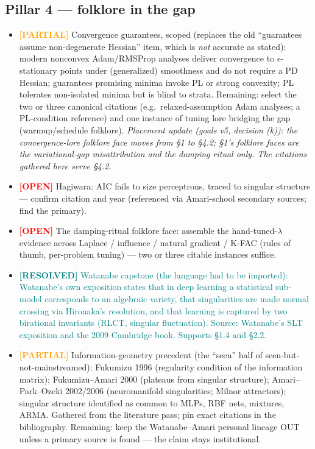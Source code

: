 \documentclass[11pt]{article}
\newcommand{\resolved}[1]{\textcolor{teal}{\textbf{[RESOLVED]} #1}}
\newcommand{\open}{\textcolor{red}{\textbf{[OPEN]}} }
\newcommand{\partialr}{\textcolor{orange}{\textbf{[PARTIAL]}} }
\begin{document}
\subsection*{Pillar 4 --- folklore in the gap}
\begin{itemize}[itemsep=4pt]
\item \partialr Convergence guarantees, scoped (replaces the old
``guarantees assume non-degenerate Hessian'' item, which is \emph{not}
accurate as stated): modern nonconvex Adam/RMSProp analyses deliver
convergence to $\epsilon$-stationary points under (generalized)
smoothness and do not require a PD Hessian; guarantees promising minima
invoke PL or strong convexity; PL tolerates non-isolated minima but is
blind to strata. Remaining: select the two or three canonical citations
(e.g.\ relaxed-assumption Adam analyses; a PL-condition reference) and
one instance of tuning lore bridging the gap (warmup/schedule folklore).
\emph{Placement update (goals v5, decision (k)): the convergence-lore
folklore face moves from \S1 to \S4.2; \S1's folklore faces are the
variational-gap misattribution and the damping ritual only. The
citations gathered here serve \S4.2.}
\item \open Hagiwara: AIC fails to size perceptrons, traced to singular
structure --- confirm citation and year (referenced via Amari-school
secondary sources; find the primary).
\item \open The damping-ritual folklore face: assemble the
hand-tuned-$\lambda$ evidence across Laplace / influence / natural
gradient / K-FAC (rules of thumb, per-problem tuning) --- two or three
citable instances suffice.
\item \resolved{Watanabe capstone (the language had to be imported):
Watanabe's own exposition states that in deep learning a statistical
sub-model corresponds to an algebraic variety, that singularities are
made normal crossing via Hironaka's resolution, and that learning is
captured by two birational invariants (RLCT, singular fluctuation).
Source: Watanabe's SLT exposition and the 2009 Cambridge book. Supports
\S1.4 and \S2.2.}
\item \partialr Information-geometry precedent (the ``seen'' half of
seen-but-not-mainstreamed): Fukumizu 1996 (regularity condition of the
information matrix); Fukumizu--Amari 2000 (plateaus from singular
structure); Amari--Park--Ozeki 2002/2006 (neuromanifold singularities;
Milnor attractors); singular structure identified as common to MLPs, RBF
nets, mixtures, ARMA. Gathered from the literature pass; pin exact
citations in the bibliography. Remaining: keep the Watanabe--Amari
personal lineage OUT unless a primary source is found --- the claim stays
institutional.
\end{itemize}
\end{document}

